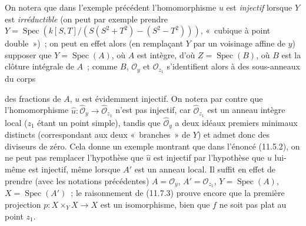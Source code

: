 \begin{env}[11.7.4]
\label{IV.11.7.4-fr}
On notera que dans l'exemple précédent l'homomorphisme $u$ est \emph{injectif}
lorsque $Y$ est \emph{irréductible} (on peut par exemple prendre
$Y=\operatorname{Spec}(k[S,T]/(S(S^2+T^2)-(S^2-T^2)))$, «~cubique à point
double~»)~; on peut en effet alors (en remplaçant $Y$ par un voisinage affine de
$y$) supposer que $Y=\operatorname{Spec}(A)$, où $A$ est intègre, d'où
$Z=\operatorname{Spec}(B)$, où $B$ est la clôture intégrale de $A$~; comme $B$,
$\mathcal O_y$ et $\mathcal O_{z_1}$ s'identifient alors à des sous-anneaux du
corps


des fractions de $A$, $u$ est évidemment injectif. On notera par contre que
l'homomorphisme $\widehat u:\widehat{\mathcal O}_y\to
\widehat{\mathcal O}_{z_1}$ n'est pas injectif, car
$\widehat{\mathcal O}_{z_1}$ est un anneau intègre local ($z_1$ étant un point
simple), tandis que $\widehat{\mathcal O}_y$ a deux idéaux premiers minimaux
distincts (correspondant aux deux «~branches~» de $Y$) et admet donc des
diviseurs de zéro. Cela donne un exemple montrant que dans l'énoncé (11.5.2), on
ne peut pas remplacer l'hypothèse que $\widehat u$ est injectif par l'hypothèse
que $u$ lui-même est injectif, même lorsque $A'$ est un anneau local. Il suffit
en effet de prendre (avec les notations précédentes) $A=\mathcal O_y$,
$A'=\mathcal O_{z_1}$, $Y=\operatorname{Spec}(A)$,
$X=\operatorname{Spec}(A')$~; le raisonnement de (11.7.3) prouve encore que la
première projection $p:X\times_Y X\to X$ est un isomorphisme, bien que $f$ ne
soit pas plat au point $z_1$.
\end{env}

